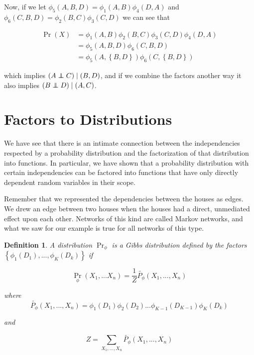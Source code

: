 \documentclass{article}
\newcommand\independent{\protect\mathpalette{\protect\independenT}{\perp}}
\def\independenT#1#2{\mathrel{\rlap{$#1#2$}\mkern2mu{#1#2}}}
\newtheorem{mydef}{Definition}
\begin{document}
Now, if we let $\phi_5(A,B,D) = \phi_1(A,B)\phi_4(D,A)$ and $\phi_6(C,B,D) = \phi_2(B,C)\phi_3(C,D)$ we can see that 

\begin{align}
\Pr(X) &= \phi_1(A,B)\phi_2(B,C)\phi_3(C,D)\phi_4(D,A) \\
&= \phi_5(A,B,D)\phi_6(C,B,D) \\
&= \phi_5(A,\left\{B,D\right\})\phi_6(C,\left\{B,D\right\})
\end{align}

which implies $(A\independent C) \mid (B,D)$, and if we combine the factors 
another way it also implies $(B\independent D) \mid (A,C)$.

\section{Factors to Distributions}
We have see that there is an intimate connection between the
independencies respected by a probability distribution and the
factorization of that distribution into functions. In particular, we
have shown that a probability distribution with certain independencies
can be factored into functions that have only directly dependent
random variables in their scope.

Remember that we represented the dependencies between the houses as
edges. We drew an edge between two houses when the houses had a
direct, unmediated effect upon each other. Networks of this kind are
called Markov networks, and what we saw for our example is true for
all networks of this type.

\begin{mydef}
A distribution $\Pr_{\phi}$ is a Gibbs distribution defined by the factors
$\left\{\phi_1(D_1),...,\phi_K(D_k)\right\}$ if

\begin{equation}
\Pr_{\phi}(X_1,...X_n) = \frac{1}{Z}\tilde{P_{\phi}}(X_1,...,X_n)
\end{equation}

where
\begin{equation}
\tilde{P_{\phi}}(X_1,...,X_n) = \phi_1(D_1)\phi_2(D_2)...\phi_{K-1}(D_{K-1})\phi_K(D_k)
\end{equation}

and

\begin{equation}
Z = \sum_{X_1,...,X_n}\tilde{P_{\phi}}(X_1,...,X_n)
\end{equation}
\end{mydef}
\end{document}
